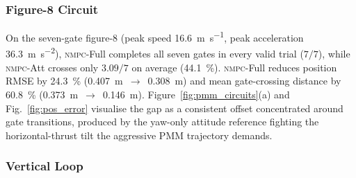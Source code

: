 \documentclass{ieeeaccess}
\newcommand{\nmpc}{\textsc{nmpc}}
\begin{document}
\begin{table}[!htbp]
  \centering
  \caption{SiL Tracking Performance: Common-Practice Yaw Reference
           (\nmpc{}-Att) vs.\ Complete Flatness Inversion
           (\nmpc{}-Full) on Both Circuits ($N=25$ MuJoCo trials with
           random external-force disturbance; mean\,$\pm$\,std over
           valid trials; Gates: mean crossings per trial; bold\,=\,best).}
  \label{tab:results}
  \renewcommand{\arraystretch}{1.05}
  \scriptsize
\end{table}

\subsubsection{Figure-8 Circuit}

On the seven-gate figure-8 (peak speed
\SI{16.6}{\metre\per\second}, peak acceleration
\SI{36.3}{\metre\per\second\squared}), \nmpc{}-Full completes all
seven gates in every valid trial ($7/7$), while \nmpc{}-Att
crosses only $3.09/7$ on average (\SI{44.1}{\percent}).
\nmpc{}-Full reduces position RMSE by \SI{24.3}{\percent}
(\SI{0.407}{\m}~$\to$~\SI{0.308}{\m}) and mean gate-crossing
distance by \SI{60.8}{\percent}
(\SI{0.373}{\m}~$\to$~\SI{0.146}{\m}).
Figure~\ref{fig:pmm_circuits}(a) and Fig.~\ref{fig:pos_error}
visualise the gap as a consistent offset concentrated around gate
transitions, produced by the yaw-only attitude reference fighting
the horizontal-thrust tilt the aggressive PMM trajectory demands.

\subsubsection{Vertical Loop}
\end{document}
